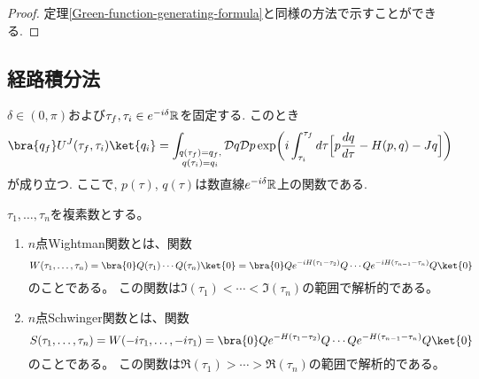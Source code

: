 \begin{proof}
  定理\ref{Green-function-generating-formula}と同様の方法で示すことができる.
\end{proof}

\subsection{経路積分法}
\begin{thm}
  $\delta \in (0, \pi)$および$\tau_f, \tau_i \in e^{-i\delta}\mathbb{R}$を固定する.
  このとき
  \begin{equation}
  \bra{q_f}U^J(\tau_f, \tau_i)\ket{q_i} =
  \int_{\substack{q(\tau_f)=q_f,\\ q(\tau_i)=q_i}}\calD q\calD p
  \exp\biggl(i\int_{\tau_i}^{\tau_f}d\tau\Bigl[
  p\frac{dq}{d\tau}-H(p,q)
  -Jq
  \Bigr]\biggr)
  \end{equation}
  が成り立つ.
  ここで, $p(\tau)$, $q(\tau)$は数直線$e^{-i\delta}\mathbb{R}$上の関数である.
\end{thm}

\begin{dfn}
  $\tau_1,\ldots,\tau_n$を複素数とする。
  \begin{enumerate}
    \item
    $n$点Wightman関数とは、関数
    \begin{equation}
      W(\tau_1,\ldots,\tau_n)
      =\bra{0}Q(\tau_1)\cdots Q(\tau_n)\ket{0}
      =\bra{0}Qe^{-iH(\tau_1-\tau_2)}Q\cdots Qe^{-iH(\tau_{n-1}-\tau_n)}Q\ket{0}
    \end{equation}
    のことである。
    この関数は$\Im(\tau_1)<\cdots<\Im(\tau_n)$の範囲で解析的である。
    \item
    $n$点Schwinger関数とは、関数
    \begin{equation}
      S(\tau_1,\ldots,\tau_n)=W(-i\tau_1,\ldots,-i\tau_1)
      =\bra{0}Qe^{-H(\tau_1-\tau_2)}Q\cdots Qe^{-H(\tau_{n-1}-\tau_n)}Q\ket{0}
    \end{equation}
    のことである。
    この関数は$\Re(\tau_1)>\cdots>\Re(\tau_n)$の範囲で解析的である。
  \end{enumerate}
\end{dfn}
